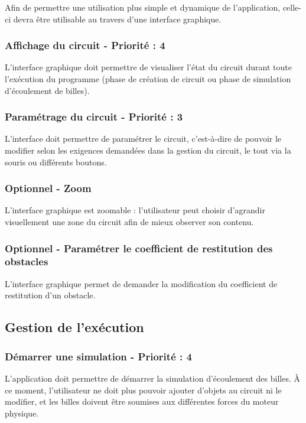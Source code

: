 \documentclass{report}
\begin{document}
Afin de permettre une utilisation plus simple et dynamique de l’application, celle-ci devra être utilisable au travers d’une interface graphique.

\subsubsection{Affichage du circuit - Priorité : 4}

L’interface graphique doit permettre de visualiser l’état du circuit durant toute l’exécution du programme (phase de création de circuit ou phase de simulation d’écoulement de billes).

\subsubsection{Paramétrage du circuit - Priorité : 3}

L’interface doit permettre de paramétrer le circuit, c’est-à-dire de pouvoir le modifier selon les exigences demandées dans la gestion du circuit, le tout via la souris ou différents boutons.

\subsubsection{Optionnel - Zoom}

L’interface graphique est zoomable : l’utilisateur peut choisir d’agrandir visuellement une zone du circuit afin de mieux observer son contenu.

\subsubsection{Optionnel - Paramétrer le coefficient de restitution des obstacles}

L’interface graphique permet de demander la modification du coefficient de restitution d’un obstacle.

\subsection{Gestion de l'exécution}

\subsubsection{Démarrer une simulation - Priorité : 4}

L’application doit permettre de démarrer la simulation d’écoulement des billes. À ce moment, l’utilisateur ne doit plus pouvoir ajouter d’objets au circuit ni le modifier, et les billes doivent être soumises aux différentes forces du moteur physique.
\end{document}
